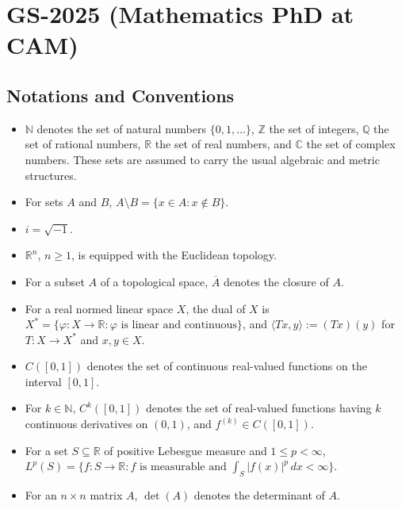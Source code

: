 \documentclass[11pt, a4paper]{article}
\begin{document}
\section{GS-2025 (Mathematics PhD at CAM)}

\subsection*{Notations and Conventions}
\begin{itemize}
  \item $\mathbb{N}$ denotes the set of natural numbers $\{0, 1, \dots\}$, $\mathbb{Z}$ the set of integers, $\mathbb{Q}$ the set of rational numbers, $\mathbb{R}$ the set of real numbers, and $\mathbb{C}$ the set of complex numbers. These sets are assumed to carry the usual algebraic and metric structures.
  \item For sets $A$ and $B$, $A \setminus B = \{x \in A : x \notin B\}$.
  \item $i = \sqrt{-1}$.
  \item $\mathbb{R}^n$, $n \ge 1$, is equipped with the Euclidean topology.
  \item For a subset $A$ of a topological space, $\overline{A}$ denotes the closure of $A$.
  \item For a real normed linear space $X$, the dual of $X$ is $X^* = \{\varphi: X \to \mathbb{R} : \varphi \text{ is linear and continuous}\}$, and $\langle Tx, y \rangle := (Tx)(y)$ for $T: X \to X^*$ and $x, y \in X$.
  \item $C([0,1])$ denotes the set of continuous real-valued functions on the interval $[0,1]$.
  \item For $k \in \mathbb{N}$, $C^k([0,1])$ denotes the set of real-valued functions having $k$ continuous derivatives on $(0,1)$, and $f^{(k)} \in C([0,1])$.
  \item For a set $S \subseteq \mathbb{R}$ of positive Lebesgue measure and $1 \le p < \infty$, $L^p(S) = \{f: S \to \mathbb{R} : f \text{ is measurable and } \int_S |f(x)|^p\,dx < \infty\}$.
  \item For an $n \times n$ matrix $A$, $\det(A)$ denotes the determinant of $A$.
\end{itemize}
\end{document}
